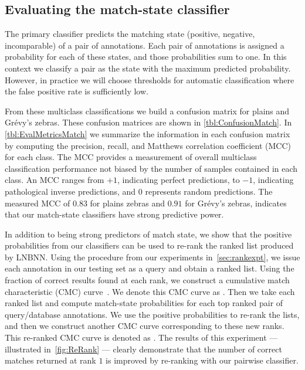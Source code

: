     \FloatBarrier{}
    \subsection{Evaluating the match-state classifier}

        The primary classifier predicts the matching state (positive, negative, incomparable) of a pair of
          annotations.
        Each pair of annotations is assigned a probability for each of these states, and those probabilities sum
          to one.
        In this context we classify a pair as the state with the maximum predicted probability.
        However, in practice we will choose thresholds for automatic classification where the false positive rate
          is sufficiently low.

        From these multiclass classifications we build a confusion matrix for plains and Grévy's zebras.
        These confusion matrices are shown in \cref{tbl:ConfusionMatch}.
        In \cref{tbl:EvalMetricsMatch} we summarize the information in each confusion matrix by computing the
          precision, recall, and Matthews correlation coefficient (MCC)~\cite{powers_evaluation_2011} for each
          class.
        The MCC provides a measurement of overall multiclass classification performance not biased by the number
          of samples contained in each class.
        An MCC ranges from $+1$, indicating perfect predictions, to $-1$, indicating pathological inverse
          predictions, and $0$ represents random predictions.
        The measured MCC of $0.83$ for plains zebras and $0.91$ for Grévy's zebras, indicates that our
          match-state classifiers have strong predictive power.

        \ConfusionMatch{}

        \EvalMetricsMatch{}

        \FloatBarrier{}

        In addition to being strong predictors of match state, we show that the positive probabilities from our
          classifiers can be used to re-rank the ranked list produced by LNBNN.
        Using the procedure from our experiments in~\cref{sec:rankexpt}, we issue each annotation in our testing
          set as a query and obtain a ranked list.
        Using the fraction of correct results found at each rank, we construct a cumulative match characteristic
          (CMC) curve~\cite{decann_relating_2013}.
        We denote this CMC curve as .
        Then we take each ranked list and compute match-state probabilities for each top ranked pair of
          query/database annotations.
        We use the positive probabilities to re-rank the lists, and then we construct another CMC curve
          corresponding to these new ranks.
        This re-ranked CMC curve is denoted as .
        The results of this experiment --- illustrated in~\cref{fig:ReRank} --- clearly demonstrate that the
          number of correct matches returned at rank $1$ is improved by re-ranking with our pairwise classifier.

